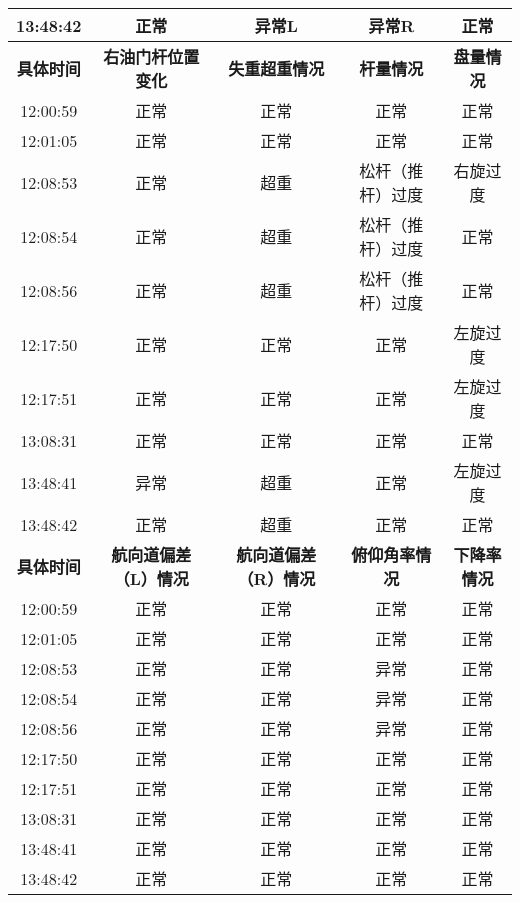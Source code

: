 \documentclass{MathorCupModeling}
\begin{document}
\begin{table}[H]
{\begin{tabular}{ccccc}
	  13:48:42 & 正常    & 异常L   & 异常R   & 正常 \\
	  \midrule
	  \textbf{具体时间} & \textbf{右油门杆位置变化} & \textbf{失重超重情况} & \textbf{杆量情况} & \textbf{盘量情况} \\
	  \midrule
	  12:00:59 & 正常    & 正常    & 正常    & 正常 \\
	  12:01:05 & 正常    & 正常    & 正常    & 正常 \\
	  12:08:53 & 正常    & 超重    & 松杆（推杆）过度 & 右旋过度 \\
	  12:08:54 & 正常    & 超重    & 松杆（推杆）过度 & 正常 \\
	  12:08:56 & 正常    & 超重    & 松杆（推杆）过度 & 正常 \\
	  12:17:50 & 正常    & 正常    & 正常    & 左旋过度 \\
	  12:17:51 & 正常    & 正常    & 正常    & 左旋过度 \\
	  13:08:31 & 正常    & 正常    & 正常    & 正常 \\
	  13:48:41 & 异常    & 超重    & 正常    & 左旋过度 \\
	  13:48:42 & 正常    & 超重    & 正常    & 正常 \\
	  \midrule
	  \textbf{具体时间} & \textbf{航向道偏差（L）情况} & \textbf{航向道偏差（R）情况} & \textbf{俯仰角率情况} & \textbf{下降率情况} \\
	  \midrule
	  12:00:59 & 正常    & 正常    & 正常    & 正常 \\
	  12:01:05 & 正常    & 正常    & 正常    & 正常 \\
	  12:08:53 & 正常    & 正常    & 异常    & 正常 \\
	  12:08:54 & 正常    & 正常    & 异常    & 正常 \\
	  12:08:56 & 正常    & 正常    & 异常    & 正常 \\
	  12:17:50 & 正常    & 正常    & 正常    & 正常 \\
	  12:17:51 & 正常    & 正常    & 正常    & 正常 \\
	  13:08:31 & 正常    & 正常    & 正常    & 正常 \\
	  13:48:41 & 正常    & 正常    & 正常    & 正常 \\
	  13:48:42 & 正常    & 正常    & 正常    & 正常 \\
	  \bottomrule
	  \end{tabular}}
	\label{tab:仿真结果部分}
  \end{table}
\end{document}
